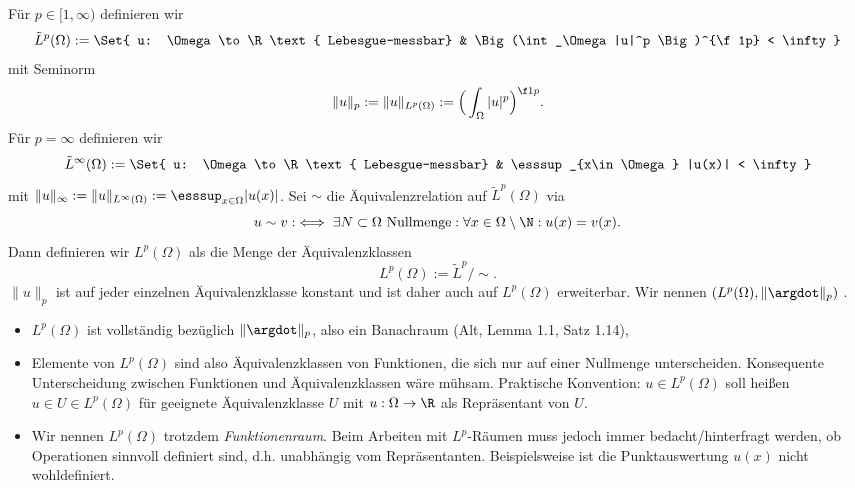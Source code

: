 \begin{df}[$L^p$-Räume] \label{1.4}
	Für $p \in [1, \infty)$ definieren wir
	\[
		\tilde L^p(\Omega) := \Set{ u: \Omega \to \R \text{ Lebesgue-messbar} & \Big(\int_\Omega |u|^p \Big)^{\f 1p} < \infty}
	\]
	mit Seminorm
	\[
		\|u\|_p := \|u\|_{L^p(\Omega)}  := \Big(\int_\Omega |u|^p \Big)^{\f 1p}.
	\]
	Für $p = \infty$ definieren wir
	\[
		\tilde L^\infty(\Omega) := \Set{ u: \Omega \to \R \text{ Lebesgue-messbar} & \esssup_{x\in \Omega} |u(x)| < \infty }
	\]
	mit $\|u\|_\infty := \|u\|_{L^\infty(\Omega)} := \esssup_{x\in \Omega} |u(x)|$.
	Sei $\sim$ die Äquivalenzrelation auf $\tilde L^p(\Omega)$ via
	\[
		u \sim v :\iff \exists N \subset \Omega \text{ Nullmenge} : \forall x \in \Omega \setminus \N : u(x) = v(x).
	\]
	Dann definieren wir $L^p(\Omega)$ als die Menge der Äquivalenzklassen
	\[
		L^p(\Omega) := \tilde L^p / \sim.
	\]
	$\|u\|_p$ ist auf jeder einzelnen Äquivalenzklasse konstant und ist daher auch auf $L^p(\Omega)$ erweiterbar.
	Wir nennen $(L^p(\Omega), \|\argdot\|_p)$ .
	\begin{note}
		\begin{itemize}
			\item
				$L^p(\Omega)$ ist vollständig bezüglich $\|\argdot\|_p$, also ein Banachraum (Alt, Lemma 1.1, Satz 1.14),
			\item
				Elemente von $L^p(\Omega)$ sind also Äquivalenzklassen von Funktionen, die sich nur auf einer Nullmenge unterscheiden.
				Konsequente Unterscheidung zwischen Funktionen und Äquivalenzklassen wäre mühsam.
				Praktische Konvention: $u \in L^p(\Omega)$ soll heißen $u \in U \in L^p(\Omega)$ für geeignete Äquivalenzklasse $U$ mit $u: \Omega \to \R$ als Repräsentant von $U$.
			\item
				Wir nennen $L^p(\Omega)$ trotzdem \emph{Funktionenraum}.
				Beim Arbeiten mit $L^p$-Räumen muss jedoch immer bedacht/hinterfragt werden, ob Operationen sinnvoll definiert sind, d.h. unabhängig vom Repräsentanten.
				Beispielsweise ist die Punktauswertung $u(x)$ nicht wohldefiniert.
		\end{itemize}
	\end{note}
\end{df}


